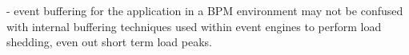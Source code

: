 - event buffering for the application in a BPM environment may not be confused with internal buffering techniques used within event engines to perform load shedding, even out short term load peaks. 

